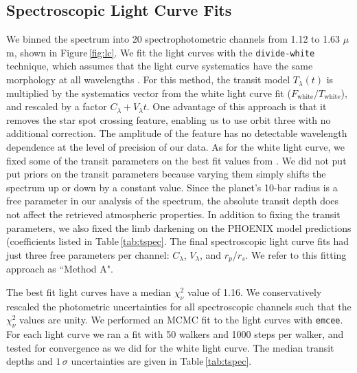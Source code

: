 \documentclass[twocolumn, trackchanges]{aastex61}
\begin{document}
\subsection{Spectroscopic Light Curve Fits}
We binned the spectrum into 20 spectrophotometric channels from 1.12 to 1.63 $\mu$m, shown in Figure\,\ref{fig:lc}. We fit the light curves with the \texttt{divide-white} technique, which assumes that the light curve systematics have the same morphology at all wavelengths \citep{stevenson14c, kreidberg14a}. For this method, the transit model $T_\lambda(t)$ is multiplied by the systematics vector from the white light curve fit ($F_\mathrm{white}/T_\mathrm{white}$), and rescaled by a factor $C_\lambda + V_\lambda t$.  One advantage of this approach is that it removes the star spot crossing feature, enabling us to use orbit three with no additional correction. The amplitude of the feature has no detectable wavelength dependence at the level of precision of our data.  As for the white light curve, we fixed some of the transit parameters on the best fit values from \cite{dai17}. We did not put put priors on the transit parameters because varying them simply shifts the spectrum up or down by a constant value. Since the planet's 10-bar radius is a free parameter in our analysis of the spectrum, the absolute transit depth does not affect the retrieved atmospheric properties. In addition to fixing the transit parameters, we also fixed the limb darkening on the PHOENIX model predictions  (coefficients listed in Table\,\ref{tab:tspec}.  The final spectroscopic light curve fits had just three free parameters per channel: $C_\lambda$, $V_\lambda$, and $r_p/r_s$.  We refer to this fitting approach as ``Method A".

The best fit light curves have a median $\chi^2_\nu$ value of 1.16.  We conservatively rescaled the photometric uncertainties for all spectroscopic channels such that the $\chi^2_\nu$ values are unity. We performed an MCMC fit to the light curves with \texttt{emcee}.  For each light curve we ran a fit with 50 walkers and 1000 steps per walker, and tested for convergence as we did for the white light curve. The median transit depths and $1\,\sigma$ uncertainties are given in Table\,\ref{tab:tspec}. 
\end{document}
